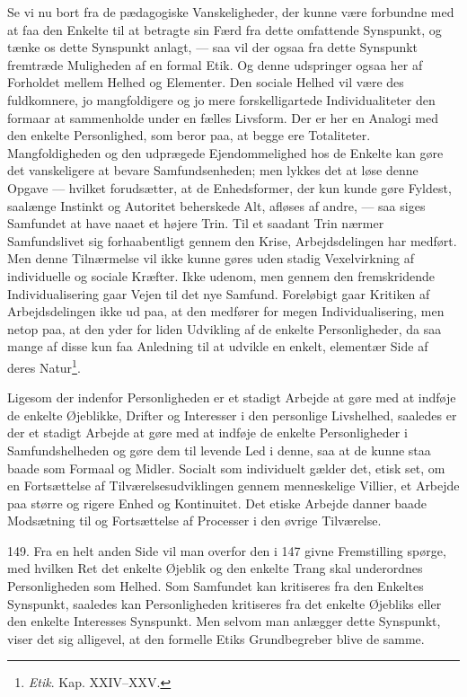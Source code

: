 \documentclass[12pt,a4paper]{book}
\newcommand{\apage}[1]{\marginnote{\footnotesize\textit{[#1]}}}
\begin{document}
Se vi nu bort fra de pædagogiske Vanskeligheder, der kunne være forbundne med at faa den
Enkelte til at betragte sin Færd fra dette omfattende Synspunkt, og tænke os dette
Synspunkt anlagt, --- saa vil der ogsaa fra dette Synspunkt fremtræde Muligheden af en
formal Etik. Og denne udspringer ogsaa her af Forholdet mellem Helhed og Elementer. Den
sociale Helhed vil være des fuldkomnere, jo mangfoldigere og jo mere forskelligartede
Individualiteter den formaar at sammenholde under en fælles Livsform. Der er her en Analogi
med den enkelte Personlighed, som beror paa, at begge ere Totaliteter. Mangfoldigheden og
den udprægede Ejendommelighed hos de Enkelte kan gøre det vanskeligere at bevare
Samfundsenheden; men lykkes det at løse denne Opgave --- hvilket forudsætter, at de
Enhedsformer, der kun kunde gøre Fyldest, saalænge Instinkt og Autoritet beherskede Alt,
afløses af andre, --- saa siges Samfundet at have naaet et højere Trin. Til et saadant Trin
nærmer Samfundslivet sig forhaabentligt gennem den Krise, Arbejdsdelingen har medført. Men
denne Tilnærmelse vil ikke kunne gøres uden stadig Vexelvirkning af individuelle og sociale
Kræfter. Ikke udenom, men gennem den fremskridende Individualisering gaar Vejen til det nye
Samfund. Foreløbigt gaar Kritiken af Arbejdsdelingen ikke ud paa, at den medfører for megen
Individualisering, men netop paa, at den yder for liden Udvikling af de enkelte \apage{357}
Personligheder, da saa mange af disse kun faa Anledning til at udvikle en enkelt, elementær
Side af deres Natur\footnote{\emph{Etik}. Kap. XXIV--XXV.}.

Ligesom der indenfor Personligheden er et stadigt Arbejde at gøre med at indføje de enkelte
Øjeblikke, Drifter og Interesser i den personlige Livshelhed, saaledes er der et stadigt
Arbejde at gøre med at indføje de enkelte Personligheder i Samfundshelheden og gøre dem til
levende Led i denne, saa at de kunne staa baade som Formaal og Midler. Socialt som
individuelt gælder det, etisk set, om en Fortsættelse af Tilværelsesudviklingen gennem
menneskelige Villier, et Arbejde paa større og rigere Enhed og Kontinuitet. Det etiske
Arbejde danner baade Modsætning til og Fortsættelse af Processer i den øvrige Tilværelse.

149. Fra en helt anden Side vil man overfor den i 147 givne Fremstilling spørge, med
hvilken Ret det enkelte Øjeblik og den enkelte Trang skal underordnes Personligheden som
Helhed. Som Samfundet kan kritiseres fra den Enkeltes Synspunkt, saaledes kan
Personligheden kritiseres fra det enkelte Øjebliks eller den enkelte Interesses Synspunkt.
Men selvom man anlægger dette Synspunkt, viser det sig alligevel, at den formelle Etiks
Grundbegreber blive de samme.
\end{document}
